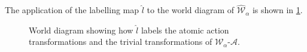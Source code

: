 The application of the labelling map $\hat{l}$ to the world diagram of $\hat{\mathscr{W}}_{\alpha}$ is shown in \cref{fig:2x2_cyclical_labelling_with_min_actions}.
\begin{fullwidth}
\begin{figure}[H]
    \centering
    \caption{
    World diagram showing how $\hat{l}$ labels the atomic action transformations and the trivial transformations of $\mathscr{W}_{\alpha}$-$\mathscr{A}$.
    }
    \label{fig:2x2_cyclical_labelling_with_min_actions}
\end{figure}
\end{fullwidth}



